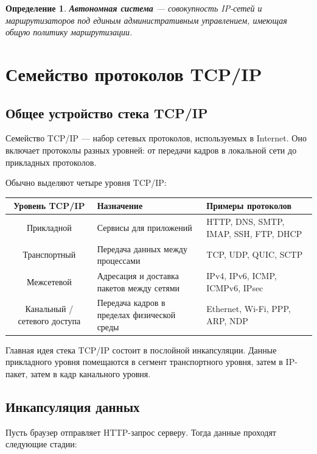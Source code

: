 \documentclass[12pt,a4paper]{article}
\newtheorem{definition}{Определение}
\begin{document}
\begin{definition}
\textbf{Автономная система} --- совокупность IP-сетей и маршрутизаторов под единым административным управлением, имеющая общую политику маршрутизации.
\end{definition}

\section{Семейство протоколов TCP/IP}

\subsection{Общее устройство стека TCP/IP}

Семейство TCP/IP --- набор сетевых протоколов, используемых в Internet. Оно включает протоколы разных уровней: от передачи кадров в локальной сети до прикладных протоколов.

Обычно выделяют четыре уровня TCP/IP:

\begin{center}
\begin{tabular}{|c|p{7cm}|p{5cm}|}
\hline
\textbf{Уровень TCP/IP} & \textbf{Назначение} & \textbf{Примеры протоколов} \\
\hline
Прикладной & Сервисы для приложений & HTTP, DNS, SMTP, IMAP, SSH, FTP, DHCP \\
\hline
Транспортный & Передача данных между процессами & TCP, UDP, QUIC, SCTP \\
\hline
Межсетевой & Адресация и доставка пакетов между сетями & IPv4, IPv6, ICMP, ICMPv6, IPsec \\
\hline
Канальный / сетевого доступа & Передача кадров в пределах физической среды & Ethernet, Wi-Fi, PPP, ARP, NDP \\
\hline
\end{tabular}
\end{center}

Главная идея стека TCP/IP состоит в послойной инкапсуляции. Данные прикладного уровня помещаются в сегмент транспортного уровня, затем в IP-пакет, затем в кадр канального уровня.

\subsection{Инкапсуляция данных}

Пусть браузер отправляет HTTP-запрос серверу. Тогда данные проходят следующие стадии:
\end{document}
